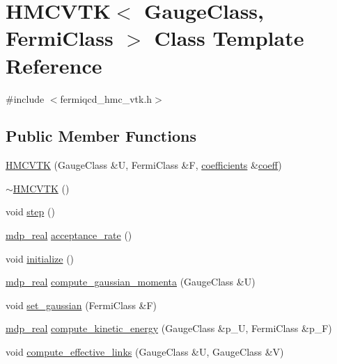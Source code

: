 \hypertarget{class_h_m_c_v_t_k}{}\section{H\+M\+C\+V\+TK$<$ Gauge\+Class, Fermi\+Class $>$ Class Template Reference}
\label{class_h_m_c_v_t_k}


{\ttfamily \#include $<$fermiqcd\+\_\+hmc\+\_\+vtk.\+h$>$}

\subsection*{Public Member Functions}
\begin{DoxyCompactItemize}
\item 
\hyperlink{class_h_m_c_v_t_k_a2142d0912c699151a5ff53039ad7389c}{H\+M\+C\+V\+TK} (Gauge\+Class \&U, Fermi\+Class \&F, \hyperlink{classcoefficients}{coefficients} \&\hyperlink{class_h_m_c_v_t_k_a6b8e384e877ba74f193b28c6799ca837}{coeff})
\item 
\hyperlink{class_h_m_c_v_t_k_ad4c849424d6ccd199101173c18d5175a}{$\sim$\+H\+M\+C\+V\+TK} ()
\item 
void \hyperlink{class_h_m_c_v_t_k_a2f14e19e4dd44528d4c62d49b9ca32e4}{step} ()
\item 
\hyperlink{mdp__global__vars_8h_a69d96b74c791e0bbdb888b3913a69450}{mdp\+\_\+real} \hyperlink{class_h_m_c_v_t_k_a9edf4ea22315f10fec9f6270387ed09d}{acceptance\+\_\+rate} ()
\item 
void \hyperlink{class_h_m_c_v_t_k_a5babc3c0b3fb9e28ad0ed64a94bb691d}{initialize} ()
\item 
\hyperlink{mdp__global__vars_8h_a69d96b74c791e0bbdb888b3913a69450}{mdp\+\_\+real} \hyperlink{class_h_m_c_v_t_k_a2a2f070a2272aa1da44728bce6664357}{compute\+\_\+gaussian\+\_\+momenta} (Gauge\+Class \&U)
\item 
void \hyperlink{class_h_m_c_v_t_k_a7b804e29bf066992f30b0fa91ace5126}{set\+\_\+gaussian} (Fermi\+Class \&F)
\item 
\hyperlink{mdp__global__vars_8h_a69d96b74c791e0bbdb888b3913a69450}{mdp\+\_\+real} \hyperlink{class_h_m_c_v_t_k_aa623dc6c375c7c0b6afdb9e1ee2f0063}{compute\+\_\+kinetic\+\_\+energy} (Gauge\+Class \&p\+\_\+U, Fermi\+Class \&p\+\_\+F)
\item 
void \hyperlink{class_h_m_c_v_t_k_a907e9d51b216657fec45d44d7ac56646}{compute\+\_\+effective\+\_\+links} (Gauge\+Class \&U, Gauge\+Class \&V)
\item 

\end{DoxyCompactItemize}
